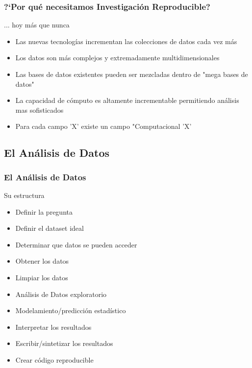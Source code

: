 \documentclass[sans serif,9pt,xcolor=dvipsnames]{beamer}%
\begin{document}
\begin{frame}
\frametitle{?`Por qué necesitamos Investigación Reproducible?}
\begin{block}{... hoy más que nunca}
\begin{itemize}
\justifying
\item Las nuevas tecnologías incrementan las colecciones de datos cada vez más
\item Los datos son más complejos y extremadamente multidimensionales
\item Las bases de datos existentes pueden ser mezcladas dentro de "mega bases de datos"
\item La capacidad de cómputo es altamente incrementable permitiendo análisis mas sofisticados
\item Para cada campo 'X' existe un campo "Computacional 'X'

\end{itemize}
\end{block}
\end{frame}

\subsection{El Análisis de Datos}
\begin{frame}
\frametitle{El Análisis de Datos }
\justifying
\begin{block}{Su estructura}
\begin{itemize}
\item Definir la pregunta
\item Definir el dataset ideal
\item Determinar que datos se pueden acceder
\item Obtener los datos
\item Limpiar los datos
\item Análisis de Datos exploratorio
\item Modelamiento/predicción estadístico
\item Interpretar los resultados
\item Escribir/sintetizar los resultados
\item Crear código reproducible
\end{itemize}
\end{block}
\end{frame}
\end{document}
